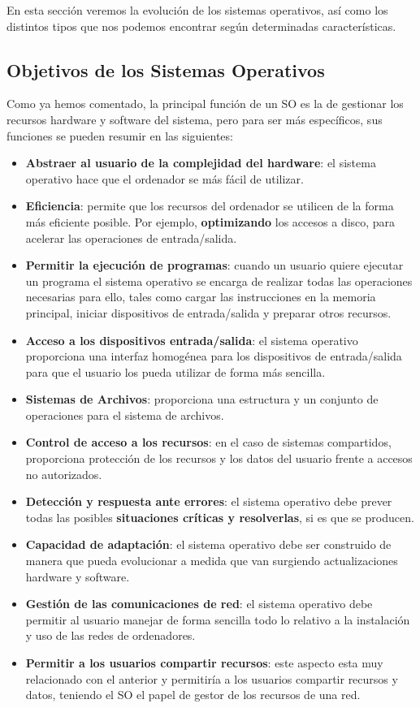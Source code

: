 En esta sección veremos la evolución de los sistemas operativos, así como los distintos tipos que nos podemos encontrar según determinadas características.

\subsection{Objetivos de los Sistemas Operativos}
Como ya hemos comentado, la principal función de un SO es la de gestionar los recursos hardware y software del sistema, pero para ser más específicos, sus funciones se pueden resumir en las siguientes:

\begin{itemize}
    \item \textbf{Abstraer al usuario de la complejidad del hardware}: el sistema operativo hace que el ordenador se más fácil de utilizar.
    \item \textbf{Eficiencia}: permite que los recursos del ordenador se utilicen de la forma más eficiente posible. Por ejemplo, \textbf{optimizando} los accesos a disco, para acelerar las operaciones de entrada/salida.
    \item \textbf{Permitir la ejecución de programas}: cuando un usuario quiere ejecutar un programa el sistema operativo se encarga de realizar todas las operaciones necesarias para ello, tales como cargar las instrucciones en la memoria principal, iniciar dispositivos de entrada/salida y preparar otros recursos.
    \item \textbf{Acceso a los dispositivos entrada/salida}: el sistema operativo proporciona una interfaz homogénea para los dispositivos de entrada/salida para que el usuario los pueda utilizar de forma más sencilla.
    \item \textbf{Sistemas de Archivos}: proporciona una estructura y un conjunto de operaciones para el sistema de archivos.
    \item \textbf{Control de acceso a los recursos}: en el caso de sistemas compartidos, proporciona protección de los recursos y los datos del usuario frente a accesos no autorizados.
    \item \textbf{Detección y respuesta  ante errores}: el sistema operativo debe prever todas las posibles \textbf{situaciones críticas y resolverlas}, si es que se producen.
    \item \textbf{Capacidad de adaptación}: el sistema operativo debe ser construido de manera que pueda evolucionar a medida que van surgiendo actualizaciones hardware y software.
    \item \textbf{Gestión de las comunicaciones de red}: el sistema operativo debe permitir al usuario manejar de forma sencilla todo lo relativo a la instalación y uso de las redes de ordenadores.
    \item \textbf{Permitir a los usuarios compartir recursos}: este aspecto esta muy relacionado con el anterior y permitiría a los usuarios compartir recursos y datos, teniendo el SO el papel de gestor de los recursos de una red.
\end{itemize}

